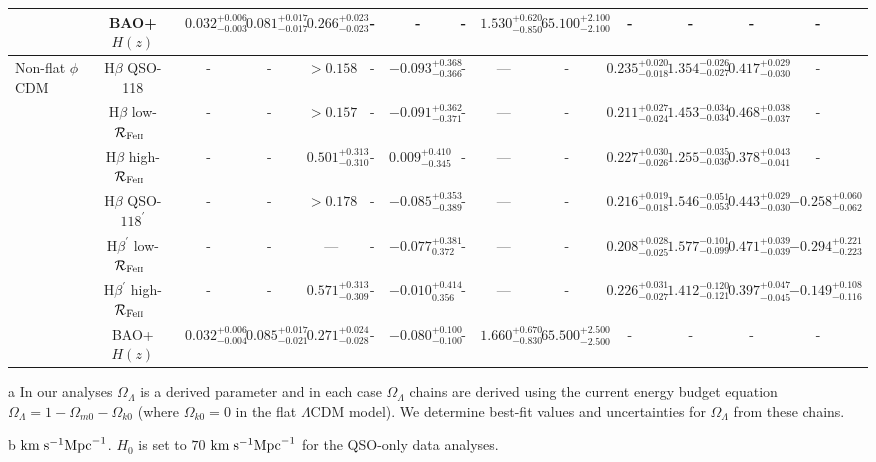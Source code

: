 \documentclass[a4paper,fleqn,usenatbib]{mnras}
\newcommand{\rfe}{${\cal R}_{\rm{Fe\textsc{ii}}}$}
\begin{document}
\begin{sidewaystable*}
\begin{adjustbox}{angle=0}
\begin{threeparttable}
{\begin{tabular}{lcccccccccccccc}
& BAO+$H(z)$ & $0.032^{+0.006}_{-0.003}$ & $0.081^{+0.017}_{-0.017}$ & $0.266^{+0.023}_{-0.023}$ & - & - & - & $1.530^{+0.620}_{-0.850}$ &$65.100^{+2.100}_{-2.100}$& - & - & - & -\\
\hline
Non-flat $\phi$CDM & H$\beta$ QSO-118 &-&-& $> 0.158$ & - & $-0.093^{+0.368}_{-0.366}$ & - & --- & - & $0.235^{+0.020}_{-0.018}$ & $1.354^{-0.026}_{-0.027}$ & $0.417^{+0.029}_{-0.030}$ & -\\
& H$\beta$ low-\rfe\ &-&-& $> 0.157$ & - & $-0.091^{+0.362}_{-0.371}$ & - & --- & - & $0.211^{+0.027}_{-0.024}$ & $1.453^{-0.034}_{-0.034}$ & $0.468^{+0.038}_{-0.037}$ & -\\
& H$\beta$ high-\rfe\ &-&-& $0.501^{+0.313}_{-0.310}$ & - & $0.009^{+0.410}_{-0.345}$ & - & --- & - & $0.227^{+0.030}_{-0.026}$ & $1.255^{-0.035}_{-0.036}$ & $0.378^{+0.043}_{-0.041}$ & -\\
& H$\beta$ QSO-$118^{\prime}$ &-&-& $> 0.178$ & - & $-0.085^{+0.353}_{-0.389}$ & - & --- & - & $0.216^{+0.019}_{-0.018}$ & $1.546^{-0.051}_{-0.053}$ & $0.443^{+0.029}_{-0.030}$ & $-0.258^{+0.060}_{-0.062}$\\
& H$\beta^{\prime}$ low-\rfe\ &-&-& --- & - & $-0.077^{+0.381}_{0.372}$ & - & --- & - & $0.208^{+0.028}_{-0.025}$ & $1.577^{-0.101}_{-0.099}$ & $0.471^{+0.039}_{-0.039}$ & $-0.294^{+0.221}_{-0.223}$\\
& H$\beta^{\prime}$ high-\rfe\ &-&-& $0.571^{+0.313}_{-0.309}$ & - & $-0.010^{+0.414}_{0.356}$ & - & --- & - & $0.226^{+0.031}_{-0.027}$ & $1.412^{-0.120}_{-0.121}$ & $0.397^{+0.047}_{-0.045}$ & $-0.149^{+0.108}_{-0.116}$\\
& BAO+$H(z)$ & $0.032^{+0.006}_{-0.004}$ & $0.085^{+0.017}_{-0.021}$ & $0.271^{+0.024}_{-0.028}$ & - & $-0.080^{+0.100}_{-0.100}$ & - & $1.660^{+0.670}_{-0.830}$ &$65.500^{+2.500}_{-2.500}$& - & - & - & -\\
\hline
\end{tabular}}
\begin{tablenotes}
\item[a]In our analyses $\Omega_{\Lambda}$ is a derived parameter and in each case $\Omega_{\Lambda}$ chains are derived using the current energy budget equation $\Omega_{\Lambda}= 1-\Omega_{m0}-\Omega_{k0}$ (where $\Omega_{k0}=0$ in the flat $\Lambda$CDM model). We determine best-fit values and uncertainties for $\Omega_{\Lambda}$ from these chains. 
\item[b]${\rm km}\hspace{1mm}{\rm s}^{-1}{\rm Mpc}^{-1}$. $H_0$ is set to $70$ ${\rm km}\hspace{1mm}{\rm s}^{-1}{\rm Mpc}^{-1}$ for the QSO-only data analyses.
\end{tablenotes}
\end{threeparttable}
\end{adjustbox}
\end{sidewaystable*}
\end{document}
